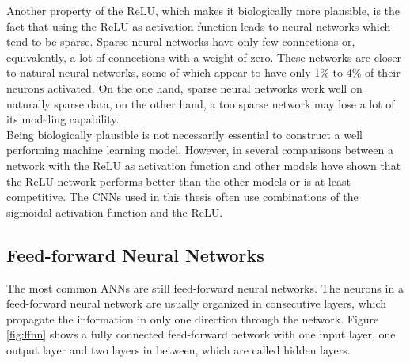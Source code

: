 \documentclass[11pt, a4paper]{article}
\begin{document}
Another property of the \ac{ReLU}, which makes it biologically more plausible, is the fact that using the \ac{ReLU} as activation function leads to neural networks which tend to be sparse. Sparse neural networks have only few connections or, equivalently, a lot of connections with a weight of zero. These networks are closer to natural neural networks, some of which appear to have only 1\% to 4\% of their neurons activated. On the one hand, sparse neural networks work well on naturally sparse data, on the other hand, a too sparse network may lose a lot of its modeling capability.\\
Being biologically plausible is not necessarily essential to construct a well performing machine learning model. However, in \cite{dsrnn} several comparisons between a network with the \ac{ReLU} as activation function and other models have shown that the \ac{ReLU} network performs better than the other models or is at least competitive. The \acp{CNN} used in this thesis often use combinations of the sigmoidal activation function and the \ac{ReLU}.

\subsection{Feed-forward Neural Networks}
\label{subsec:feed_forward_neural_networks}

The most common \acp{ANN} are still feed-forward neural networks. The neurons in a feed-forward neural network are usually organized in consecutive layers, which propagate the information in only one direction through the network. Figure \ref{fig:ffnn} shows a fully connected feed-forward network with one input layer, one output layer and two layers in between, which are called hidden layers.

\end{document}
